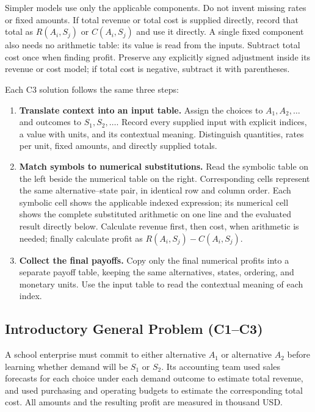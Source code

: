 Simpler models use only the applicable components. Do not invent missing rates
or fixed amounts. If total revenue or total cost is supplied directly, record
that total as \(R(A_i,S_j)\) or \(C(A_i,S_j)\) and use it directly. A single fixed
component also needs no arithmetic table: its value is read from the inputs.
Subtract total cost once when finding profit. Preserve any explicitly signed
adjustment inside its revenue or cost model; if total cost is negative, subtract
it with parentheses.

Each C3 solution follows the same three steps:
\begin{enumerate}
\item \textbf{Translate context into an input table.} Assign the choices to
\(A_1,A_2,\ldots\) and outcomes to \(S_1,S_2,\ldots\). Record every supplied
input with explicit indices, a value with units, and its contextual meaning.
Distinguish quantities, rates per unit, fixed amounts, and directly supplied totals.
\item \textbf{Match symbols to numerical substitutions.} Read the symbolic
table on the left beside the numerical table on the right. Corresponding cells
represent the same alternative--state pair, in identical row and column order.
Each symbolic cell shows the applicable indexed expression; its numerical cell
shows the complete substituted arithmetic on one line and the evaluated result
directly below. Calculate revenue first, then cost, when arithmetic is needed;
finally calculate profit as \(R(A_i,S_j)-C(A_i,S_j)\).
\item \textbf{Collect the final payoffs.} Copy only the final numerical profits
into a separate payoff table, keeping the same alternatives, states, ordering,
and monetary units. Use the input table to read the contextual meaning of each index.
\end{enumerate}

\subsection{Introductory General Problem (C1--C3)}
	\label{sec:problem1-introductory-general-c1-c3}

	A school enterprise must commit to either alternative \(A_1\) or alternative \(A_2\) before learning whether demand will be \(S_1\) or \(S_2\). Its accounting team used sales forecasts for each choice under each demand outcome to estimate total revenue, and used purchasing and operating budgets to estimate the corresponding total cost. All amounts and the resulting profit are measured in thousand USD.

